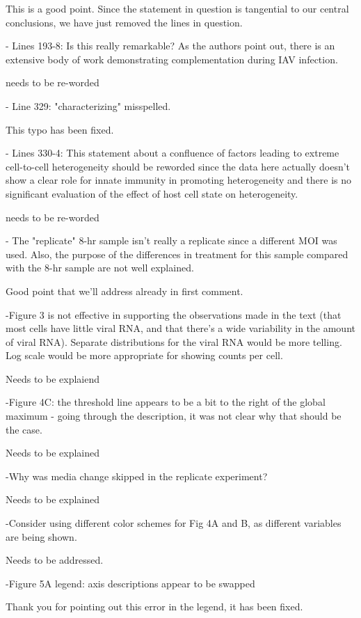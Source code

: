 \documentclass[11pt, oneside]{article}   	%
\begin{document}
{\color{black}
This is a good point. 
Since the statement in question is tangential to our central conclusions, we have just removed the lines in question.
}

- Lines 193-8: Is this really remarkable? As the authors point out, there is an extensive body of work demonstrating complementation during IAV infection. 

{\color{red} needs to be re-worded}

- Line 329: "characterizing" misspelled. 

{\color{black}
This typo has been fixed.
}

- Lines 330-4: This statement about a confluence of factors leading to extreme cell-to-cell heterogeneity should be reworded since the data here actually doesn't show a clear role for innate immunity in promoting heterogeneity and there is no significant evaluation of the effect of host cell state on heterogeneity. 

{\color{red} needs to be re-worded}

- The "replicate" 8-hr sample isn't really a replicate since a different MOI was used. Also, the purpose of the differences in treatment for this sample compared with the 8-hr sample are not well explained. 

{\color{red}
Good point that we'll address already in first comment.}

-Figure 3 is not effective in supporting the observations made in the text (that most cells have little viral RNA, and that there's a wide variability in the amount of viral RNA). Separate distributions for the viral RNA would be more telling. Log scale would be more appropriate for showing counts per cell. 

{\color{red} Needs to be explaiend}

-Figure 4C: the threshold line appears to be a bit to the right of the global maximum - going through the description, it was not clear why that should be the case. 

{\color{red} Needs to be explained}

-Why was media change skipped in the replicate experiment? 

{\color{red} Needs to be explained}

-Consider using different color schemes for Fig 4A and B, as different variables are being shown. 

{\color{red} Needs to be addressed.}

-Figure 5A legend: axis descriptions appear to be swapped

{\color{black}
Thank you for pointing out this error in the legend, it has been fixed.
}
\end{document}
